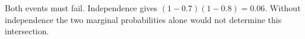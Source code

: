 Both events must fail. Independence gives $(1-0.7)(1-0.8)=\boxed{0.06}$. Without independence the two marginal probabilities alone would not determine this intersection.
